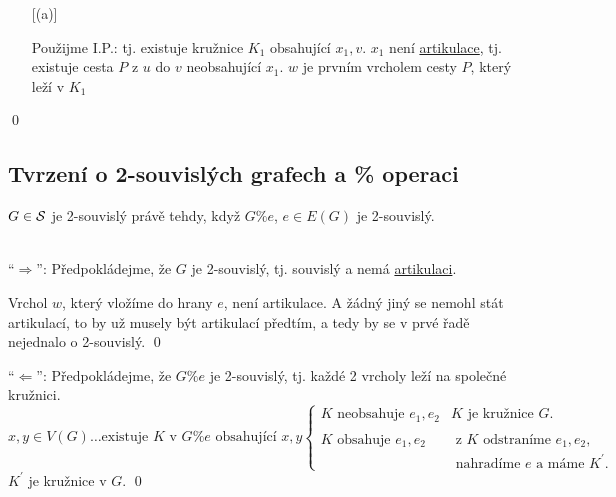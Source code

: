 \begin{enumerate} [(a)]
\begin{figure}[H]
    \end{figure}
    Použijme I.P.: tj. existuje kružnice $K_1$ obsahující $x_1, v$. $x_1$ není \hyperref[artikulace]{artikulace}, tj. 
    existuje cesta $P$ z $u$ do $v$ neobsahující $x_1$. $w$ je prvním vrcholem cesty $P$, který leží v $K_1$ 
\end{enumerate}
\hspace{\fill}\qed

\subsection{Tvrzení o 2-souvislých grafech a \% operaci}
$G \in \S$ je 2-souvislý právě tehdy, když $G \% e$, $e \in E(G)$ je 2-souvislý.

\\
\enquote{$\Rightarrow$}: Předpokládejme, že $G$ je 2-souvislý, tj. souvislý a nemá \hyperref[artikulace]{artikulaci}.

Vrchol $w$, který vložíme do hrany $e$, není artikulace. A žádný jiný se nemohl stát artikulací, to by už musely být 
artikulací předtím, a tedy by se v prvé řadě nejednalo o 2-souvislý.
\hspace{\fill}\qed

\enquote{$\Leftarrow$}: Předpokládejme, že $G \% e$ je 2-souvislý, tj. každé 2 vrcholy leží na společné kružnici.
\[
    x, y \in V(G) \dots \text{existuje } K \text{ v } G \% e \text{ obsahující } x, y
    \begin{cases}
        K \text{ neobsahuje } e_1, e_2 & K \text{ je kružnice } G. \\
        \\
        K \text{ obsahuje } e_1, e_2 & \text{ z } K \text{ odstraníme } e_1, e_2, \\ 
        & \text{ nahradíme } e \text{ a máme } K^\prime.
    \end{cases}
\]
$K^\prime$ je kružnice v $G$. 
\hspace{\fill}\qed

